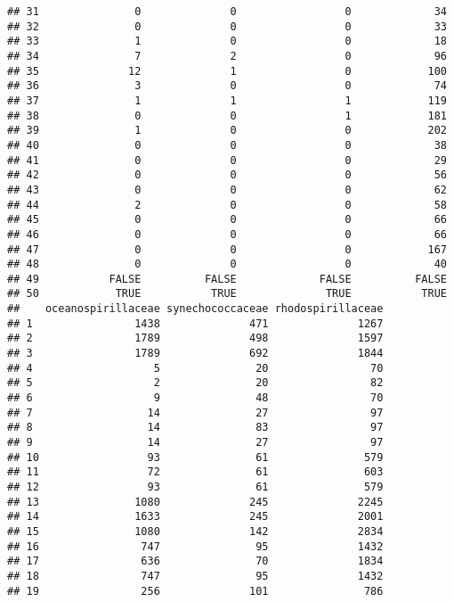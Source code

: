 \documentclass[12pt]{beamer}\usepackage[]{graphicx}\usepackage[]{color}
\makeatletter
\newenvironment{kframe}{%
 \def\at@end@of@kframe{}%
 \ifinner\ifhmode%
  \def\at@end@of@kframe{\end{minipage}}%
  \begin{minipage}{\columnwidth}%
 \fi\fi%
 \def\FrameCommand##1{\hskip\@totalleftmargin \hskip-\fboxsep
 \colorbox{shadecolor}{##1}\hskip-\fboxsep
     \hskip-\linewidth \hskip-\@totalleftmargin \hskip\columnwidth}%
 \MakeFramed {\advance\hsize-\width
   \@totalleftmargin\z@ \linewidth\hsize
   \@setminipage}}%
 {\par\unskip\endMakeFramed%
 \at@end@of@kframe}
\newenvironment{knitrout}{}{} %
\makeatother
\begin{document}
\begin{frame}[fragile]
\begin{knitrout}
\begin{kframe}
\begin{verbatim}
## 31               0              0                 0             34
## 32               0              0                 0             33
## 33               1              0                 0             18
## 34               7              2                 0             96
## 35              12              1                 0            100
## 36               3              0                 0             74
## 37               1              1                 1            119
## 38               0              0                 1            181
## 39               1              0                 0            202
## 40               0              0                 0             38
## 41               0              0                 0             29
## 42               0              0                 0             56
## 43               0              0                 0             62
## 44               2              0                 0             58
## 45               0              0                 0             66
## 46               0              0                 0             66
## 47               0              0                 0            167
## 48               0              0                 0             40
## 49           FALSE          FALSE             FALSE          FALSE
## 50            TRUE           TRUE              TRUE           TRUE
##    oceanospirillaceae synechococcaceae rhodospirillaceae
## 1                1438              471              1267
## 2                1789              498              1597
## 3                1789              692              1844
## 4                   5               20                70
## 5                   2               20                82
## 6                   9               48                70
## 7                  14               27                97
## 8                  14               83                97
## 9                  14               27                97
## 10                 93               61               579
## 11                 72               61               603
## 12                 93               61               579
## 13               1080              245              2245
## 14               1633              245              2001
## 15               1080              142              2834
## 16                747               95              1432
## 17                636               70              1834
## 18                747               95              1432
## 19                256              101               786

\end{verbatim}
\end{kframe}
\end{knitrout}
\end{frame}
\end{document}
